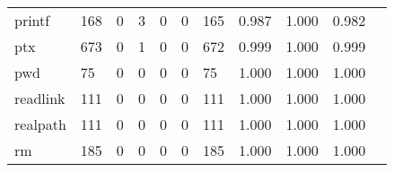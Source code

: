 \begin{longtable}{lp{1.2cm}p{1.2cm}p{1.2cm}p{1.2cm}p{1.2cm}p{1.2cm}p{1.2cm}p{1.2cm}p{1.2cm}p{1.2cm}}
printf    &                                   168 &                                                  0 &                                                  3 &                                                  0 &                                                  0 &                                                165 &                                              0.987 &                                              1.000 &                                              0.982 \\
ptx       &                                   673 &                                                  0 &                                                  1 &                                                  0 &                                                  0 &                                                672 &                                              0.999 &                                              1.000 &                                              0.999 \\
pwd       &                                    75 &                                                  0 &                                                  0 &                                                  0 &                                                  0 &                                                 75 &                                              1.000 &                                              1.000 &                                              1.000 \\
readlink  &                                   111 &                                                  0 &                                                  0 &                                                  0 &                                                  0 &                                                111 &                                              1.000 &                                              1.000 &                                              1.000 \\
realpath  &                                   111 &                                                  0 &                                                  0 &                                                  0 &                                                  0 &                                                111 &                                              1.000 &                                              1.000 &                                              1.000 \\
rm        &                                   185 &                                                  0 &                                                  0 &                                                  0 &                                                  0 &                                                185 &                                              1.000 &                                              1.000 &                                              1.000 \\

\end{longtable}
